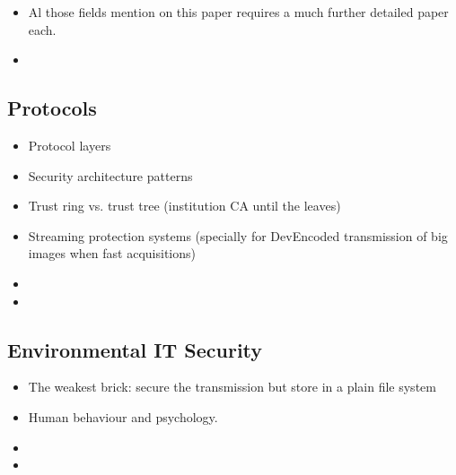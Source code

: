 \documentclass[10pt,a4paper,twoside]{llncs}
\begin{document}
\begin{itemize}
 \item Al those fields mention on this paper requires a much further detailed paper each.
 \item 
\end{itemize}

%
\subsection{Protocols \label{sec:protocols}}

\begin{itemize}
 \item Protocol layers \cite{Schneier:1995:ACP:572932}
 \item Security architecture patterns
 \item Trust ring vs. trust tree (institution CA until the leaves)
 \item Streaming protection systems (specially for DevEncoded transmission of big images when fast acquisitions)
 \item 
 \item 
\end{itemize}

%
\subsection{Environmental IT Security \label{sec:environment}}

\begin{itemize}
 \item The weakest brick: secure the transmission but store in a plain file system
 \item Human behaviour and psychology.
 \item 
 \item 
\end{itemize}



\end{document}
